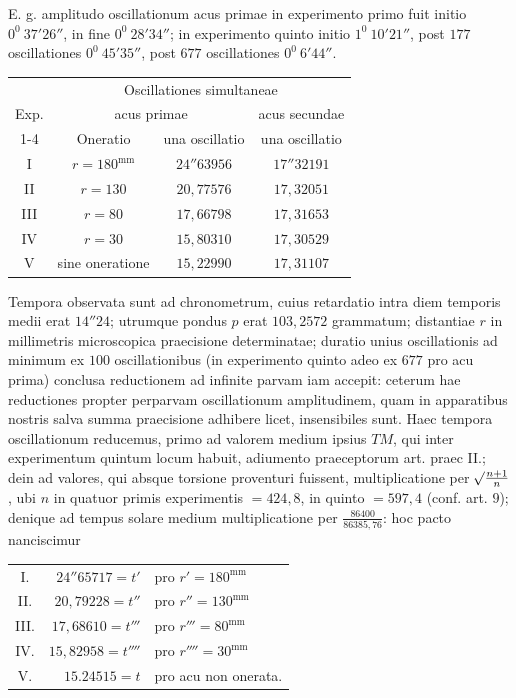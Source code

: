 \expandafter\def\csname HistoricalNoteText10\endcsname{E. g. amplitudo oscillationum acus primae in experimento primo fuit initio $0^0\ 37'26''$, in fine $0^0\ 28'34''$; in experimento quinto initio $1^0\ 10'21''$, post $177$ oscillationes $0^0\ 45'35''$, post $677$ oscillationes $0^0\ 6'44''$.}
\begin{center}
\begin{tabular}{c||c|c||c}
&\multicolumn{3}{c}{Oscillationes simultaneae}\\
Exp.&\multicolumn{2}{c||}{acus primae}&acus secundae\\\cline{1-4}
&Oneratio&una oscillatio&una oscillatio\\
I&$r=180^{\mathrm{mm}}$&$24''63956$&$17''32191$\\
II&$r=130$&$20{,}77576$&$17{,}32051$\\
III&$r=80$&$17{,}66798$&$17{,}31653$\\
IV&$r=30$&$15{,}80310$&$17{,}30529$\\
V&sine oneratione&$15{,}22990$&$17{,}31107$
\end{tabular}
\end{center}

Tempora observata sunt ad chronometrum, cuius retardatio intra diem temporis medii erat $14''24$; utrumque pondus $p$ erat $103{,}2572$ grammatum; distantiae $r$ in millimetris microscopica praecisione determinatae; duratio unius oscillationis ad minimum ex $100$ oscillationibus (in experimento quinto adeo ex $677$ pro acu prima) conclusa reductionem ad infinite parvam iam accepit: ceterum hae reductiones propter perparvam oscillationum amplitudinem, quam in apparatibus nostris salva summa praecisione adhibere licet, insensibiles sunt. Haec tempora oscillationum reducemus, primo ad valorem medium ipsius $TM$, qui inter experimentum quintum locum habuit, adiumento praeceptorum art. praec II.; dein ad valores, qui absque torsione proventuri fuissent, multiplicatione per $\mathord{{}^{}\!\surd}\frac{n+1}{n}$, ubi $n$ in quatuor primis experimentis $=424{,}8$, in quinto $=597{,}4$ (conf. art. $9$); denique ad tempus solare medium multiplicatione per $\frac{86400}{86385{,}76}$: hoc pacto nanciscimur
\begin{center}
\begin{tabular}{crl}
I.&$24''65717=t'$&pro $r'=180^{\mathrm{mm}}$\\
II.&$20{,}79228=t''$&pro $r''=130^{\mathrm{mm}}$\\
III.&$17{,}68610=t'''$&pro $r'''=80^{\mathrm{mm}}$\\
IV.&$15{,}82958=t''''$&pro $r''''=30^{\mathrm{mm}}$\\
V.&$15.24515=t$&pro acu non onerata.
\end{tabular}
\end{center}

